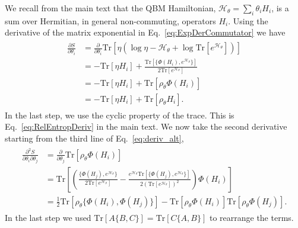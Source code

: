 \documentclass[
    aps,
    prx,
    floatfix,
    nofootinbib,
    onecolumn
]{revtex4-2}
\newcommand{\Tr}{\mathrm{Tr}}
\begin{document}
We recall from the main text that the QBM Hamiltonian, $\mathcal{H}_\theta = \sum_{i}\theta_{i} H_{i}$, is a sum over Hermitian, in general non-commuting, operators $H_i$. 
Using the derivative of the matrix exponential in Eq.~\eqref{eq:ExpDerCommutator} we have
\begin{align}
\begin{split}
\label{eq:deriv_alt}
    \frac{\partial S}{\partial \theta_{i}} &= \frac{\partial}{\partial \theta_{i}} \Tr[ \eta \left( \log{\eta}-\mathcal{H}_\theta+\log \Tr[e^{\mathcal{H}_\theta} ] \right ) ] \\
    &= -\Tr[\eta H_{i}] + \frac{ \Tr[ \{\Phi(H_i), e^{\mathcal{H}_\theta} \} ] } {2 \Tr[e^{\mathcal{H}_\theta}] }  \\
    &= -\Tr[\eta H_{i}] +\Tr[\rho_\theta \Phi(H_{i})] \\
    &= -\Tr[\eta H_{i}] +\Tr[\rho_\theta H_{i}].
\end{split}
\end{align}
In the last step, we use the cyclic property of the trace. This is Eq.~\eqref{eq:RelEntropDeriv} in the main text.
We now take the second derivative starting from the third line of Eq.~\eqref{eq:deriv_alt}, 
\begin{align}
\begin{split}
\label{eq:hessian_new}
    \frac{\partial^2 S}{\partial \theta_{i} \partial \theta_{j}} &=  \frac{\partial}{\partial \theta_{j} } \Tr[\rho_\theta \Phi(H_{i})] \\
    &= \Tr[\left( \frac{ \{ \Phi(H_j), e^{\mathcal{H}_\theta} \} } {2 \Tr[e^{\mathcal{H}_\theta} ] }  - \frac{ e^{\mathcal{H}_\theta} \Tr[ \{ \Phi(H_j), e^{\mathcal{H}_\theta} \} ] } {2 (\Tr[e^{\mathcal{H}_\theta} ])^2} \right)  \Phi(H_{i}) ]\\
    &= \frac{1}{2} \Tr[ \rho_\theta \{ \Phi(H_i), \Phi(H_j) \}] - \Tr[ \rho_\theta \Phi(H_i)] \Tr[ \rho_\theta \Phi(H_j)] . 
\end{split}
\end{align} 
In the last step we used $\Tr[ A \{B, C\}] = \Tr[ C \{A, B\}]$ to rearrange the terms.
\end{document}
